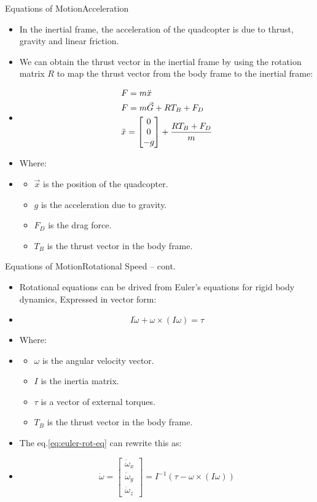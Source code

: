 \documentclass[8pt]{beamer}
\newcommand{\Ytri}{$\triangleright$ }
\renewcommand{\|}[1][.3em]{\hspace{#1}|\hspace{#1}}
\renewcommand{\,}[1][.3em]{,\hspace{#1}}
\newcommand{\subitem}{\item[\Ytri]}
\begin{document}
\begin{frame}{Equations of Motion}{Acceleration}
    \begin{itemize}%
    \item In the inertial frame, the acceleration of the quadcopter is due to thrust, gravity and linear friction.
    \item We can obtain the thrust vector in the inertial frame by using the rotation matrix $R$ to map the thrust vector from the body frame to the inertial frame:
    \item[] \begin{align}
    &F = m\ddot{x}\\
    &F = m\vec{G} + RT_B + F_D\\
    &\ddot{x} = \begin{bmatrix}
    0\\0\\-g
    \end{bmatrix} + {{RT_B + F_D} \over m}
    \end{align}
    \item Where:
    \item[] \begin{itemize}
        \subitem $\vec{x}$ is the position of the quadcopter.
        \subitem $g$ is the acceleration due to gravity.
        \subitem $F_D$ is the drag force.
        \subitem $T_B$ is the thrust vector in the body frame.
    \end{itemize}
    \end{itemize}
\end{frame}

\begin{frame}{Equations of Motion}{Rotational Speed -- cont.}
    \begin{itemize}%
    \item Rotational equations can be drived from Euler's equations for rigid body dynamics, Expressed in vector form:
    \item[] \begin{equation}
    I\dot{\omega} + \omega \times (I\omega) = \tau
    \label{eq:euler-rot-eq}
    \end{equation}
    \item Where:
    \item[] \begin{itemize}
        \subitem $\omega$ is the angular velocity vector.
        \subitem $I$ is the inertia matrix.
        \subitem $\tau$ is a vector of external torques.
        \subitem $T_B$ is the thrust vector in the body frame.
    \end{itemize}
    \item The eq.\ref{eq:euler-rot-eq} can rewrite this as:
    \item[] \begin{equation}
    \dot{\omega} = \begin{bmatrix}
    \dot{\omega}_x\\\dot{\omega}_y\\\dot{\omega}_z
    \end{bmatrix} = I^{-1}(\tau - \omega\times(I\omega))
    \end{equation}
    \end{itemize}
\end{frame}
\end{document}
